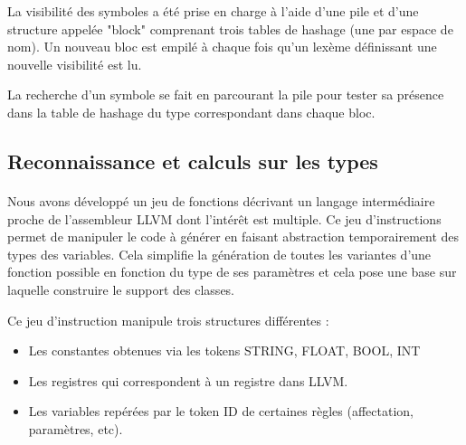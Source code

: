 \documentclass[12pt]{article}
\begin{document}
La visibilité des symboles a été prise en charge à l'aide d'une pile et d'une
structure appelée "block" comprenant trois tables de hashage (une par espace
de nom). Un nouveau bloc est empilé à chaque fois qu'un lexème définissant une
nouvelle visibilité est lu.

La recherche d'un symbole se fait en parcourant la pile pour
tester sa présence dans la table de hashage du type correspondant dans chaque
bloc.



\subsection{Reconnaissance et calculs sur les types}

\paragraph{} Nous avons développé un jeu de fonctions décrivant un langage intermédiaire
proche de l'assembleur LLVM dont l'intérêt est multiple. Ce jeu d'instructions
permet de manipuler le code à générer en faisant abstraction temporairement
des types des variables. Cela simplifie la génération de toutes les variantes
d'une fonction possible en fonction du type de ses paramètres et cela pose une
base sur laquelle construire le support des classes.

Ce jeu d'instruction manipule trois structures différentes :
\begin{itemize}
	\item Les constantes obtenues via les tokens STRING, FLOAT, BOOL, INT
	\item Les registres qui correspondent à un registre dans LLVM.
	\item Les variables repérées par le token ID de certaines règles (affectation, paramètres, etc).
\end{itemize}
\end{document}
